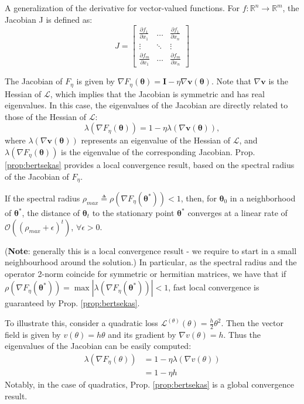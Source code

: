 \documentclass{article}
\renewcommand{\vec}[1]{\ensuremath{\boldsymbol{#1}}}
\newcommand{\mat}[1]{\ensuremath{\boldsymbol{#1}}}
\newcommand{\btheta}[0]{\ensuremath{\boldsymbol{\theta}}}
\begin{document}
\begin{defn}[Jacobian] A generalization of the derivative for vector-valued functions. For $f: \mathbb{R}^n \rightarrow \mathbb{R}^m$, the Jacobian J is defined as:
\[
    J = 
    \begin{bmatrix} 
        \frac{\partial f_1}{\partial x_1} & \dots & \frac{\partial f_1}{\partial x_n} \\
        \vdots & \ddots & \vdots \\
        \frac{\partial f_m}{\partial x_1} & \dots & \frac{\partial f_m}{\partial x_n} 
    \end{bmatrix}
\]
\end{defn} 

The Jacobian of $F_\eta$ is given by $\nabla F_\eta(\btheta) = \mat{I} - \eta \nabla \vec{v}(\btheta)$. Note that $\nabla \vec{v}$ is the Hessian of $\mathcal{L}$, which implies that the Jacobian is symmetric and has real eigenvalues. In this case, the eigenvalues of the Jacobian are directly related to those of the Hessian of $\mathcal{L}$:
\begin{equation}
    \lambda (\nabla F_\eta (\btheta)) = 1 - \eta \lambda(\nabla \vec{v} (\btheta)),
\end{equation}
where $ \lambda(\nabla \vec{v} (\btheta))$ represents an eigenvalue of the Hessian of  $\mathcal{L}$, and $\lambda (\nabla F_\eta (\btheta))$ is the eigenvalue of the corresponding Jacobian. Prop. \ref{prop:bertsekas} provides a local convergence result, based on the spectral radius of the Jacobian of $F_\eta$.

\begin{prop} \label{prop:bertsekas}
If the spectral radius $\rho_{max} \triangleq \rho (\nabla F_\eta (\vec{\theta}^*)) < 1$, then, for $\vec{\theta}_0$ in a neighborhood of $\vec{\theta}^*$, the distance of $\vec{\theta}_t$ to the stationary point $\vec{\theta }^*$ converges at a linear rate of $\mathcal{O}\left(\left(\rho_{max} + \epsilon \right)^t\right)$, $\forall \epsilon > 0$.
\end{prop}
(\textbf{Note}: generally this is a local convergence result - we require to start in a small neighbourhood around the solution.)
In particular, as the spectral radius and the operator 2-norm coincide for symmetric or hermitian matrices, we have that if $\rho (\nabla F_\eta (\btheta^*)) = \max |\lambda (\nabla F_\eta (\btheta^*))| < 1$, fast local convergence is guaranteed by Prop. \ref{prop:bertsekas}.
\par
To illustrate this, consider a quadratic loss $\mathcal{L}^{(\theta)}(\theta) = \frac{h}{2} \theta^2$. Then the vector field is given by $v(\theta) = h\theta$ and its gradient by $\nabla v(\theta) = h$. Thus the eigenvalues of the Jacobian can be easily computed:
\begin{align}
    \lambda(\nabla F_\eta (\theta)) &= 1-\eta \lambda(\nabla v(\theta)) \nonumber \\
    &= 1 -\eta h
\end{align}
Notably, in the case of quadratics, Prop. \ref{prop:bertsekas} is a global convergence result. 
\\
      
\end{document}
